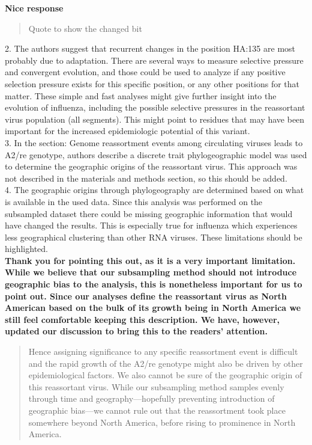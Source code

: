 \documentclass[11pt,oneside,letterpaper]{article}
\begin{document}
\textbf{Nice response}

\begin{quotation}
Quote to show the changed bit
\end{quotation}

2. The authors suggest that recurrent changes in the position HA:135 are most probably due to adaptation. There are several ways to measure selective pressure and convergent evolution, and those could be used to analyze if any positive selection pressure exists for this specific position, or any other positions for that matter. These simple and fast analyses might give further insight into the evolution of influenza, including the possible selective pressures in the reassortant virus population (all segments). This might point to residues that may have been important for the increased epidemiologic potential of this variant.\\

3. In the section: Genome reassortment events among circulating viruses leads to A2/re genotype, authors describe a discrete trait phylogeographic model was used to determine the geographic origins of the reassortant virus. This approach was not described in the materials and methods section, so this should be added.\\

4. The geographic origins through phylogeography are determined based on what is available in the used data. Since this analysis was performed on the subsampled dataset there could be missing geographic information that would have changed the results. This is especially true for influenza which experiences less geographical clustering than other RNA viruses. These limitations should be highlighted.\\

\textbf{Thank you for pointing this out, as it is a very important limitation. While we believe that our subsampling method should not introduce geographic bias to the analysis, this is nonetheless important for us to point out. Since our analyses define the reassortant virus as North American based on the bulk of its growth being in North America we still feel comfortable keeping this description. We have, however, updated our discussion to bring this to the readers' attention.}

\begin{quotation}
  Hence assigning significance to any specific reassortment event is difficult and the rapid growth of the A2/re genotype might also be driven by other epidemiological factors.
  We also cannot be sure of the geographic origin of this reassortant virus.
  While our subsampling method samples evenly through time and geography---hopefully preventing introduction of geographic bias---we cannot rule out that the reassortment took place somewhere beyond North America, before rising to prominence in North America.
\end{quotation}
\end{document}
